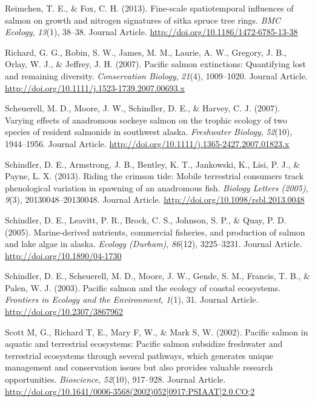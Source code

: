 \documentclass [11pt, proquest] {uwthesis}[2015/03/03]
\begin{document}
\hypertarget{ref-Reimchen2013}{}
Reimchen, T. E., \& Fox, C. H. (2013). Fine-scale spatiotemporal
influences of salmon on growth and nitrogen signatures of sitka spruce
tree rings. \emph{BMC Ecology}, \emph{13}(1), 38--38. Journal Article.
\url{http://doi.org/10.1186/1472-6785-13-38}

\hypertarget{ref-Gustafson2007}{}
Richard, G. G., Robin, S. W., James, M. M., Laurie, A. W., Gregory, J.
B., Orlay, W. J., \& Jeffrey, J. H. (2007). Pacific salmon extinctions:
Quantifying lost and remaining diversity. \emph{Conservation Biology},
\emph{21}(4), 1009--1020. Journal Article.
\url{http://doi.org/10.1111/j.1523-1739.2007.00693.x}

\hypertarget{ref-Scheuerell2007}{}
Scheuerell, M. D., Moore, J. W., Schindler, D. E., \& Harvey, C. J.
(2007). Varying effects of anadromous sockeye salmon on the trophic
ecology of two species of resident salmonids in southwest alaska.
\emph{Freshwater Biology}, \emph{52}(10), 1944--1956. Journal Article.
\url{http://doi.org/10.1111/j.1365-2427.2007.01823.x}

\hypertarget{ref-Schindler2013}{}
Schindler, D. E., Armstrong, J. B., Bentley, K. T., Jankowski, K., Lisi,
P. J., \& Payne, L. X. (2013). Riding the crimson tide: Mobile
terrestrial consumers track phenological variation in spawning of an
anadromous fish. \emph{Biology Letters (2005)}, \emph{9}(3),
20130048--20130048. Journal Article.
\url{http://doi.org/10.1098/rsbl.2013.0048}

\hypertarget{ref-Schindler2005}{}
Schindler, D. E., Leavitt, P. R., Brock, C. S., Johnson, S. P., \& Quay,
P. D. (2005). Marine-derived nutrients, commercial fisheries, and
production of salmon and lake algae in alaska. \emph{Ecology (Durham)},
\emph{86}(12), 3225--3231. Journal Article.
\url{http://doi.org/10.1890/04-1730}

\hypertarget{ref-Schindler2003}{}
Schindler, D. E., Scheuerell, M. D., Moore, J. W., Gende, S. M.,
Francis, T. B., \& Palen, W. J. (2003). Pacific salmon and the ecology
of coastal ecosystems. \emph{Frontiers in Ecology and the Environment},
\emph{1}(1), 31. Journal Article. \url{http://doi.org/10.2307/3867962}

\hypertarget{ref-Gende2002}{}
Scott M, G., Richard T, E., Mary F, W., \& Mark S, W. (2002). Pacific
salmon in aquatic and terrestrial ecosystems: Pacific salmon subsidize
freshwater and terrestrial ecosystems through several pathways, which
generates unique management and conservation issues but also provides
valuable research opportunities. \emph{Bioscience}, \emph{52}(10),
917--928. Journal Article.
\href{http://doi.org/10.1641/0006-3568(2002)052\%5B0917:PSIAAT\%5D2.0.CO;2}{http://doi.org/10.1641/0006-3568(2002)052{[}0917:PSIAAT{]}2.0.CO;2}
\end{document}
